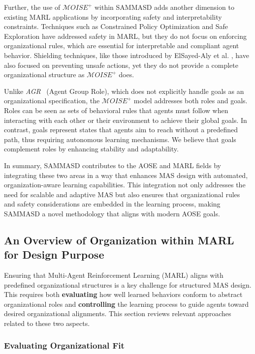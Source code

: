 \documentclass[sigconf,anonymous]{aamas}
\begin{document}
Further, the use of $\mathcal{M}OISE^+$ within SAMMASD adds another dimension to existing MARL applications by incorporating safety and interpretability constraints. Techniques such as Constrained Policy Optimization \cite{zhao2024} and Safe Exploration \cite{melcer2024} have addressed safety in MARL, but they do not focus on enforcing organizational rules, which are essential for interpretable and compliant agent behavior. Shielding techniques, like those introduced by ElSayed-Aly et al. \cite{elsayed2021}, have also focused on preventing unsafe actions, yet they do not provide a complete organizational structure as $\mathcal{M}OISE^+$ does.

Unlike \textit{AGR}~\cite{ferber2003} (Agent Group Role), which does not explicitly handle goals as an organizational specification, the $\mathcal{M}OISE^+$ model addresses both roles and goals. Roles can be seen as sets of behavioral rules that agents must follow when interacting with each other or their environment to achieve their global goals. In contrast, goals represent states that agents aim to reach without a predefined path, thus requiring autonomous learning mechanisms. We believe that goals complement roles by enhancing stability and adaptability.

In summary, SAMMASD contributes to the AOSE and MARL fields by integrating these two areas in a way that enhances MAS design with automated, organization-aware learning capabilities. This integration not only addresses the need for scalable and adaptive MAS but also ensures that organizational rules and safety considerations are embedded in the learning process, making SAMMASD a novel methodology that aligns with modern AOSE goals.

\subsection{An Overview of Organization within MARL for Design Purpose}

Ensuring that Multi-Agent Reinforcement Learning (MARL) aligns with predefined organizational structures is a key challenge for structured MAS design. This requires both \textbf{evaluating} how well learned behaviors conform to abstract organizational roles and \textbf{controlling} the learning process to guide agents toward desired organizational alignments. This section reviews relevant approaches related to these two aspects.

\subsubsection{Evaluating Organizational Fit}
\end{document}
